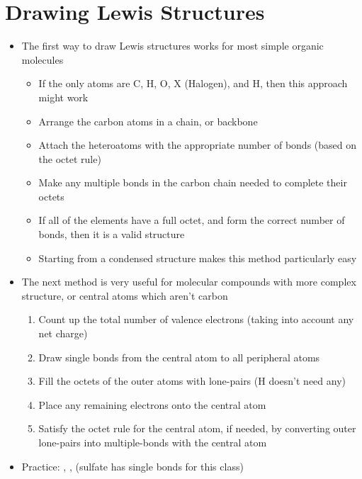 \documentclass[12pt, openany, letterpaper]{memoir}
\begin{document}
\section{Drawing Lewis Structures}
\begin{itemize}
	\item The first way to draw Lewis structures works for most simple organic molecules
	\begin{itemize}
		\item If the only atoms are C, H, O, X (Halogen), and H, then this approach might work
		\item Arrange the carbon atoms in a chain, or backbone
		\item Attach the heteroatoms with the appropriate number of bonds (based on the octet rule)
		\item Make any multiple bonds in the carbon chain needed to complete their octets
		\item If all of the elements have a full octet, and form the correct number of bonds, then it is a valid structure
		\item Starting from a condensed structure makes this method particularly easy
	\end{itemize}
	\item The next method is very useful for molecular compounds with more complex structure, or central atoms which aren't carbon
	\begin{enumerate}
		\item Count up the total number of valence electrons (taking into account any net charge)
		\item Draw single bonds from the central atom to all peripheral atoms
		\item Fill the octets of the outer atoms with lone-pairs (H doesn't need any)
		\item Place any remaining electrons onto the central atom
		\item Satisfy the octet rule for the central atom, if needed, by converting outer lone-pairs into multiple-bonds with the central atom
	\end{enumerate}
	\item Practice: , ,  (sulfate has single bonds for this class)
\end{itemize}
\end{document}

